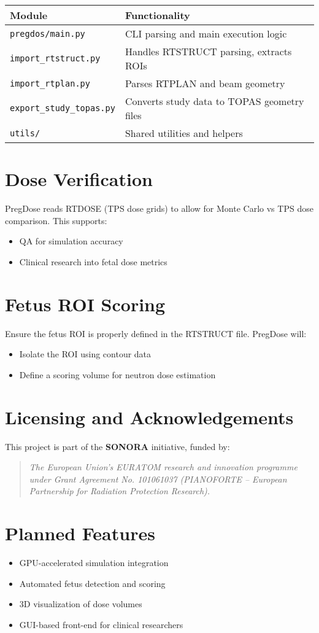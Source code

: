 \documentclass[11pt]{article}
\begin{document}
\begin{longtable}{|l|p{10cm}|}
\hline
\textbf{Module} & \textbf{Functionality} \\
\hline
\texttt{pregdos/main.py} & CLI parsing and main execution logic \\
\texttt{import\_rtstruct.py} & Handles RTSTRUCT parsing, extracts ROIs \\
\texttt{import\_rtplan.py} & Parses RTPLAN and beam geometry \\
\texttt{export\_study\_topas.py} & Converts study data to TOPAS geometry files \\
\texttt{utils/} & Shared utilities and helpers \\
\hline
\end{longtable}

\section{Dose Verification}

PregDose reads RTDOSE (TPS dose grids) to allow for Monte Carlo vs TPS dose comparison. This supports:
\begin{itemize}
    \item QA for simulation accuracy
    \item Clinical research into fetal dose metrics
\end{itemize}

\section{Fetus ROI Scoring}

Ensure the fetus ROI is properly defined in the RTSTRUCT file. PregDose will:
\begin{itemize}
    \item Isolate the ROI using contour data
    \item Define a scoring volume for neutron dose estimation
\end{itemize}

\section{Licensing and Acknowledgements}

This project is part of the \textbf{SONORA} initiative, funded by:

\begin{quote}
\textit{The European Union’s EURATOM research and innovation programme under Grant Agreement No. 101061037 (PIANOFORTE – European Partnership for Radiation Protection Research).}
\end{quote}

\section{Planned Features}

\begin{itemize}
    \item GPU-accelerated simulation integration
    \item Automated fetus detection and scoring
    \item 3D visualization of dose volumes
    \item GUI-based front-end for clinical researchers
\end{itemize}
\end{document}
